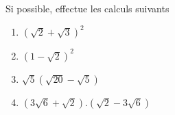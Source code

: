 %
%
    Si possible, effectue les calculs suivants
    \begin{enumerate}[cols=2]
        \item $(\sqrt{2}+\sqrt{3})^2$
        \item $(1-\sqrt{2})^2$
        \item $\sqrt{5}\left(\sqrt{20} - \sqrt{5}\right)$
        \item $(3\sqrt{6}+\sqrt{2}).(\sqrt{2}-3\sqrt{6})$
    \end{enumerate}
